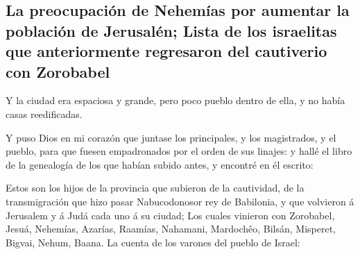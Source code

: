 \hypertarget{la-preocupaciuxf3n-de-nehemuxedas-por-aumentar-la-poblaciuxf3n-de-jerusaluxe9n-lista-de-los-israelitas-que-anteriormente-regresaron-del-cautiverio-con-zorobabel}{%
\subsection{La preocupación de Nehemías por aumentar la población de
Jerusalén; Lista de los israelitas que anteriormente regresaron del
cautiverio con
Zorobabel}\label{la-preocupaciuxf3n-de-nehemuxedas-por-aumentar-la-poblaciuxf3n-de-jerusaluxe9n-lista-de-los-israelitas-que-anteriormente-regresaron-del-cautiverio-con-zorobabel}}

 Y la ciudad era espaciosa y grande, pero poco pueblo dentro
de ella, y no había casas reedificadas.

 Y puso Dios en mi corazón que juntase los principales, y
los magistrados, y el pueblo, para que fuesen empadronados por el orden
de sus linajes: y hallé el libro de la genealogía de los que habían
subido antes, y encontré en él escrito:

 Estos son los hijos de la provincia que subieron de la
cautividad, de la transmigración que hizo pasar Nabucodonosor rey de
Babilonia, y que volvieron á Jerusalem y á Judá cada uno á su ciudad;
 Los cuales vinieron con Zorobabel, Jesuá, Nehemías,
Azarías, Raamías, Nahamani, Mardochêo, Bilsán, Misperet, Bigvai, Nehum,
Baana. La cuenta de los varones del pueblo de Israel:

